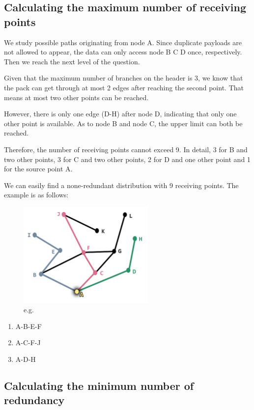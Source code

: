 \documentclass{mcmthesis}
\begin{document}
\subsection{Calculating the maximum number of receiving points}

We study possible paths originating from node A. Since duplicate payloads are not allowed to appear, the data can only access node B C D once, respectively. Then we reach the next level of the question.

Given that the maximum number of branches on the header is 3, we know that the pack can get through at most 2 edges after reaching the second point. That means at most two other points can be reached.

However, there is only one edge (D-H) after node D, indicating that only one other point is available. As to node B and node C, the upper limit can both be reached.

Therefore, the number of receiving points cannot exceed 9. In detail, 3 for B and two other points, 3 for C and two other points, 2 for D and one other point and 1 for the source point A.

We can easily find a none-redundant distribution with 9 receiving points. The example is as follows:

\begin{figure}[H]
	\centering
	\includegraphics[width = 0.6\textwidth]{figure/fig.1-1.png}
	\caption{e.g.}
	\label{fig:1-1}
\end{figure}




\begin{enumerate}[ \quad(1).]
	\item A-B-E-F
	\item A-C-F-J
	\item A-D-H
\end{enumerate}

\subsection{Calculating the minimum number of redundancy}
\end{document}
